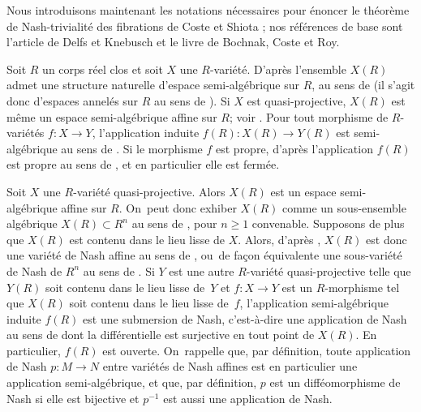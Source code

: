 \documentclass[11pt]{article}
\theoremstyle{definition}
\begin{document}
Nous introduisons maintenant les notations nécessaires pour énoncer le théorème de Nash-trivialité des fibrations
de Coste et Shiota \cite{coste1992nash}; nos références de base sont l'article \cite{delfs1981semialgebraicII} de Delfs et Knebusch et le livre \cite{bochnak1998real} de Bochnak, Coste et Roy.

Soit $R$ un corps réel clos et soit $X$ une $R$-variété. D'après \cite[Ex.\,2 p.\,182]{delfs1981semialgebraicII} l'ensemble $X(R)$ admet une structure naturelle d'espace semi-algébrique sur $R$, au sens de \cite[Def.\,3 p.\,182]{delfs1981semialgebraicII} (il s'agit donc d'espaces annelés sur $R$ au sens de \cite[Def.\,2 p.\,182]{delfs1981semialgebraicII}). Si $X$ est quasi-projective, $X(R)$ est même un espace semi-algébrique affine sur $R$; voir \cite[Rem.\ p.\,182]{delfs1981semialgebraicII}. Pour tout morphisme de $R$-variétés $f\colon X\to Y$, l'application induite $f(R)\colon X(R)\to Y(R)$ est semi-algébrique au sens de \cite[p.\,184]{delfs1981semialgebraicII}. Si le morphisme $f$ est propre, d'après \cite[Th.\,9.6]{delfs1981semialgebraicII} l'application $f(R)$ est propre au sens de \cite[Def.\ p.\,192]{delfs1981semialgebraicII}, et en particulier elle est fermée.

Soit $X$ une $R$-variété quasi-projective. Alors $X(R)$ est un espace semi-algébrique affine sur $R$. On~peut donc exhiber $X(R)$ comme un sous-ensemble algébrique \hbox{$X(R)\subset R^n$} au sens de \cite[Def.\,2.1.1]{bochnak1998real}, pour $n\geq 1$ convenable. Supposons de plus que $X(R)$ est contenu dans le lieu lisse de $X$. Alors, d'après \cite[Prop.\,3.3.11]{bochnak1998real}, $X(R)$ est donc une variété de Nash affine au sens de \cite[p.\,351]{coste1992nash}, ou~de façon équivalente une sous-variété de Nash de $R^n$ au sens de \cite[Def.\,2.9.9]{bochnak1998real}. Si $Y$ est une autre $R$-variété quasi-projective telle que $Y(R)$ soit contenu dans le lieu lisse de~$Y$ et $f\colon X\to Y$ est un $R$-morphisme tel que $X(R)$ soit contenu dans le lieu lisse de~$f$, l'application semi-algébrique induite $f(R)$ est une submersion de Nash, c'est-à-dire une application de Nash au sens de \cite[Def.\,2.9.9]{bochnak1998real} dont la différentielle est surjective en tout point de $X(R)$. En particulier, $f(R)$ est ouverte. On~rappelle que, par définition, toute application de Nash $p\colon M\to N$ entre variétés de Nash affines est en particulier une application semi-algébrique, et que, par définition, $p$ est un difféomorphisme de Nash si elle est bijective et $p^{-1}$ est aussi une application de Nash.
\end{document}
